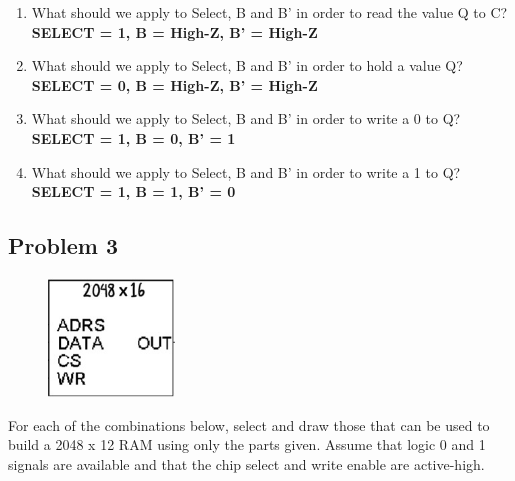 \documentclass{article}
\begin{document}
\begin{enumerate}[label=\alph*.]
\item What should we apply to Select, B and B’ in order to read the value Q to C? \\
\textbf{SELECT = 1, B = High-Z, B' = High-Z}
\item What should we apply to Select, B and B’ in order to hold a value Q? \\
\textbf{SELECT = 0, B = High-Z, B' = High-Z}
\item What should we apply to Select, B and B’ in order to write a 0 to Q? \\
\textbf{SELECT = 1, B = 0, B' = 1}
\item What should we apply to Select, B and B’ in order to write a 1 to Q?
\textbf{SELECT = 1, B = 1, B' = 0}
\end{enumerate}

\newpage
\subsection*{Problem 3}
\begin{figure}[!h]
    \centering
    \includegraphics[width=0.3\textwidth]{figures/memory_q1.jpg}
\end{figure}
For each of the combinations below, select and draw those that can be used to build a 2048 x 12 RAM using only the parts given. Assume that logic 0 and 1 signals are available and that the chip select and write enable are active-high.
\end{document}
